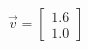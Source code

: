 \documentclass[preview]{standalone}
\begin{document}
\begin{align*}
\vec{v}=\begin{bmatrix}1.6\\1.0\end{bmatrix}
\end{align*}
\end{document}
